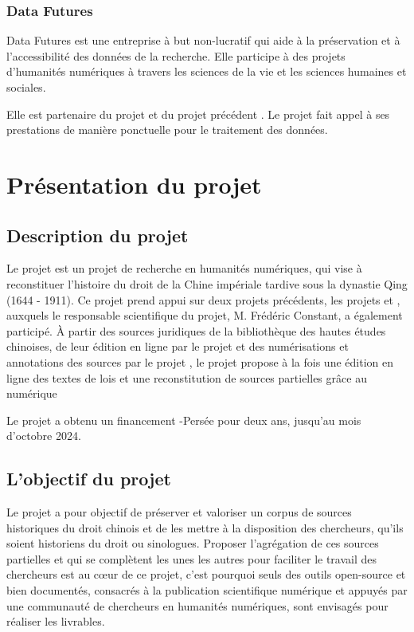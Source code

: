 \subsubsection{Data Futures}
Data Futures est une entreprise à but non-lucratif qui aide à la préservation et à l'accessibilité des données de la recherche. Elle participe à des projets d'humanités numériques à travers les sciences de la vie et les sciences humaines et sociales.

Elle est partenaire du projet \COREL et du projet précédent \EPJ. Le projet fait appel à ses prestations de manière ponctuelle pour le traitement des données.

\section{Présentation du projet \COREL}
\subsection{Description du projet}
Le projet \COREL est un projet de recherche en humanités numériques, qui vise à reconstituer l'histoire du droit de la Chine impériale tardive sous la dynastie Qing (1644 - 1911). Ce projet prend appui sur deux projets précédents, les projets \LSC et \EPJ, auxquels le responsable scientifique du projet, M. Frédéric Constant, a également participé. À partir des sources juridiques de la bibliothèque des hautes études chinoises, de leur édition en ligne par le projet \LSC et des numérisations et annotations des sources par le projet \EPJ, le projet \COREL propose à la fois une édition en ligne des textes de lois et une reconstitution de sources partielles grâce au numérique

Le projet a obtenu un financement \CollEx-Persée pour deux ans, jusqu'au mois d'octobre 2024. 

\subsection{L’objectif du projet}
Le projet \COREL a pour objectif de préserver et valoriser un corpus de sources historiques du droit chinois et de les mettre à la disposition des chercheurs, qu'ils soient historiens du droit ou sinologues. Proposer l'agrégation de ces sources partielles et qui se complètent les unes les autres pour faciliter le travail des chercheurs est au c\oe ur de ce projet, c'est pourquoi seuls des outils open-source et bien documentés, consacrés à la publication scientifique numérique et appuyés par une communauté de chercheurs en humanités numériques, sont envisagés pour réaliser les livrables.

